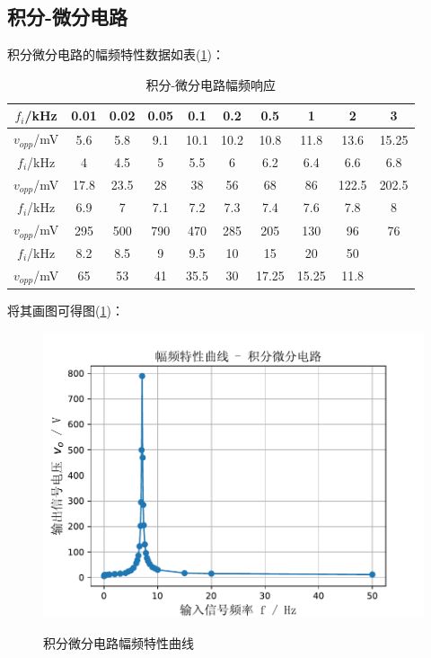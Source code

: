 \documentclass[a4paper]{article}
\begin{document}
\subsection{积分-微分电路}
积分微分电路的幅频特性数据如表(\ref{int-diff-table})：
\begin{table}[!h]
\centering
\caption{积分-微分电路幅频响应}
\label{int-diff-table}
\begin{tabular}{|c|c|c|c|c|c|c|c|c|c|}
\hline
\rowcolor[HTML]{EFEFEF} 
$f_i$/kHz    & 0.01 & 0.02 & 0.05 & 0.1  & 0.2  & 0.5   & 1     & 2     & 3     \\ \hline
$v_{opp}$/mV & 5.6  & 5.8  & 9.1  & 10.1 & 10.2 & 10.8  & 11.8  & 13.6  & 15.25 \\ \hline
\rowcolor[HTML]{EFEFEF} 
$f_i$/kHz    & 4    & 4.5  & 5    & 5.5  & 6    & 6.2   & 6.4   & 6.6   & 6.8   \\ \hline
$v_{opp}$/mV & 17.8 & 23.5 & 28   & 38   & 56   & 68    & 86    & 122.5 & 202.5 \\ \hline
\rowcolor[HTML]{EFEFEF} 
$f_i$/kHz    & 6.9  & 7    & 7.1  & 7.2  & 7.3  & 7.4   & 7.6   & 7.8   & 8     \\ \hline
$v_{opp}$/mV & 295  & 500  & 790  & 470  & 285  & 205   & 130   & 96    & 76    \\ \hline
\rowcolor[HTML]{EFEFEF} 
$f_i$/kHz    & 8.2  & 8.5  & 9    & 9.5  & 10   & 15    & 20    & 50    &       \\ \hline
$v_{opp}$/mV & 65   & 53   & 41   & 35.5 & 30   & 17.25 & 15.25 & 11.8  &       \\ \hline
\end{tabular}
\end{table}

将其画图可得图(\ref{AFC_int_diff_fig})：
\begin{figure}[!h]
\centering
\includegraphics[width=12cm]{fig/AFC_int_diff.pdf}\\
\caption{积分微分电路幅频特性曲线}\label{AFC_int_diff_fig}
\end{figure}
\end{document}
